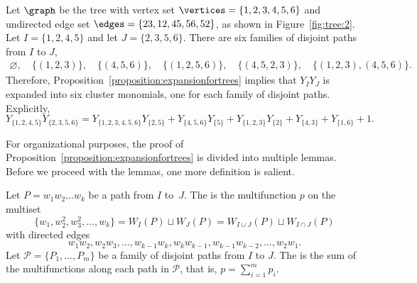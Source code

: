 \begin{exam}
    Let \(\graph\) be the tree with vertex set \(\vertices = \{1,\allowbreak 2,\allowbreak 3,\allowbreak 4,\allowbreak 5,\allowbreak 6\}\) and undirected edge set \(\edges = \{23,\allowbreak 12,\allowbreak 45,\allowbreak 56,\allowbreak 52\}\), as shown in Figure~\ref{fig:tree:2}.
    Let \(I = \{1, 2, 4, 5\}\) and let \(J = \{2, 3, 5, 6\}\).
    There are six families of disjoint paths from \(I\) to \(J\), 
    \begin{gather*}
        \varnothing, \quad
        \big\{ (1, 2, 3) \big\}, \quad
        \big\{ (4, 5, 6) \big\}, \quad
        \big\{ (1, 2, 5, 6) \big\}, \quad
        \big\{ (4, 5, 2, 3) \big\}, \quad
        \big\{ (1, 2, 3), (4, 5, 6) \big\}.
    \end{gather*}
    Therefore, Proposition~\ref{proposition:expansionfortrees} implies that \(Y_IY_J\) is expanded into six cluster monomials, one for each family of disjoint paths. Explicitly,
    \begin{equation*}
        Y_{\{1, 2, 4, 5\}} Y_{\{2, 3, 5, 6\}}
        = Y_{\{1, 2, 3, 4, 5, 6\}} Y_{\{2, 5\}}
        + Y_{\{4, 5, 6\}} Y_{\{5\}}
        + Y_{\{1, 2, 3\}} Y_{\{2\}}
        + Y_{\{4, 3\}}
        + Y_{\{1, 6\}}
        + 1.
    \end{equation*}
\end{exam}

For organizational purposes, the proof of Proposition~\ref{proposition:expansionfortrees} is divided into multiple lemmas.
Before we proceed with the lemmas,
one more definition is salient.

\begin{defi}
    Let \(P = w_1w_2\dots w_k\) be a path from \(I\) to~\(J\).
    The  is the multifunction \(p\) on the multiset
    \begin{equation*}
        \{w_1, w_2^2, w_3^2, \dots, w_k\} = W_I(P) \sqcup W_J(P) = W_{I \cup J}(P) \sqcup W_{I \cap J}(P)
    \end{equation*}
    with directed edges
    \begin{equation*}
        w_1w_2, w_2w_3, \dots, w_{k-1}w_k,
        w_kw_{k-1}, w_{k-1}w_{k-2}, \dots, w_2w_1.
    \end{equation*}
    Let \(\mathcal{P} = \{P_1, \dots, P_m\}\) be a family of disjoint paths from \(I\) to \(J\).
    The  is the sum of the multifunctions along each path in \(\mathcal{P}\),
    that is, \(p = \sum_{i=1}^m p_i\).
\end{defi}

